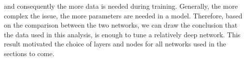 and consequently the more data is needed during training. Generally, the more complex the issue, the more parameters are needed in a model. Therefore, 
based on the comparison between the two networks, we can draw the conclusion that the data used in this analysis, is enough to tune a relatively 
deep network. This result motivated the choice of layers and nodes for all networks used in the sections to come.
\begin{figure}
\end{figure}
